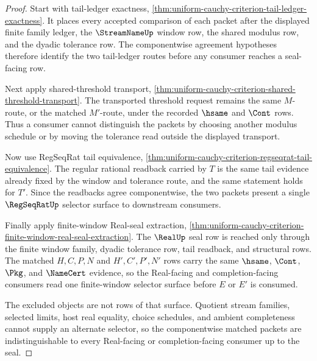 \begin{proof}
Start with tail-ledger exactness, \autoref{thm:uniform-cauchy-criterion-tail-ledger-exactness}. It places every accepted comparison of each packet after the displayed finite family ledger, the $\StreamNameUp$ window row, the shared modulus row, and the dyadic tolerance row. The componentwise agreement hypotheses therefore identify the two tail-ledger routes before any consumer reaches a seal-facing row.

Next apply shared-threshold transport, \autoref{thm:uniform-cauchy-criterion-shared-threshold-transport}. The transported threshold request remains the same $M$-route, or the matched $M'$-route, under the recorded $\hsame$ and $\Cont$ rows. Thus a consumer cannot distinguish the packets by choosing another modulus schedule or by moving the tolerance read outside the displayed transport.

Now use RegSeqRat tail equivalence, \autoref{thm:uniform-cauchy-criterion-regseqrat-tail-equivalence}. The regular rational readback carried by $T$ is the same tail evidence already fixed by the window and tolerance route, and the same statement holds for $T'$. Since the readbacks agree componentwise, the two packets present a single $\RegSeqRatUp$ selector surface to downstream consumers.

Finally apply finite-window Real-seal extraction, \autoref{thm:uniform-cauchy-criterion-finite-window-real-seal-extraction}. The $\RealUp$ seal row is reached only through the finite window family, dyadic tolerance row, tail readback, and structural rows. The matched $H,C,P,N$ and $H',C',P',N'$ rows carry the same $\hsame$, $\Cont$, $\Pkg$, and $\NameCert$ evidence, so the Real-facing and completion-facing consumers read one finite-window selector surface before $E$ or $E'$ is consumed.

The excluded objects are not rows of that surface. Quotient stream families, selected limits, host real equality, choice schedules, and ambient completeness cannot supply an alternate selector, so the componentwise matched packets are indistinguishable to every Real-facing or completion-facing consumer up to the seal.
\end{proof}
